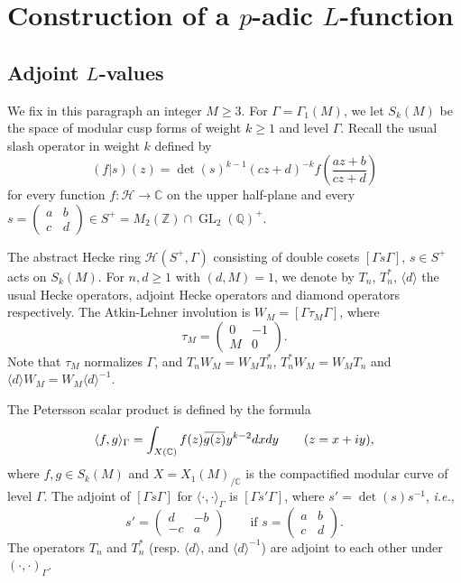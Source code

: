 \documentclass[12pt]{amsart}
\newcommand\bC{\mathbb{C}}
\newcommand\bZ{\mathbb{Z}}
\newcommand\bQ{\mathbb{Q}}
\newcommand\cH{\mathcal{H}}
\newcommand\sH{\mathscr{H}}
\newcommand{\ob}[1]{\mkern 1.5mu\overline{\mkern-1.5mu#1\mkern-1.5mu}\mkern 1.5mu}
\DeclareMathOperator{\GL}{GL}
\theoremstyle{defstyle}
\theoremstyle{thmstyle}
\begin{document}
\section{Construction of a $p$-adic $L$-function}\label{sec:section_2_construction_p_adic_L}
\subsection{Adjoint $L$-values}\label{sec:adjoint_L_values}
We fix in this paragraph an integer $M\geq 3$. For $\Gamma=\Gamma_1(M)$, we let $S_k(M)$ be the space of modular cusp forms of weight $k\geq 1$ and level $\Gamma$. Recall the usual slash operator in weight $k$ defined by
\[(f|s)(z)= \det(s)^{k-1}(cz+d)^{-k}f(\frac{az+b}{cz+d}) \] 
for every function $f\colon \sH \to \bC$ on the upper half-plane and every $s=\left(\begin{smallmatrix}a & b \\ c & d\end{smallmatrix}\right)\in S^+=M_2(\bZ)\cap \GL_2(\bQ)^+$.

The abstract Hecke ring $\cH(S^+,\Gamma)$ consisting of double cosets $[\Gamma s \Gamma]$, $s\in S^+$ acts on $S_k(M)$. For $n,d\geq 1$ with $(d,M)=1$, we denote by $T_n$, $T^*_n$, $\langle d \rangle$ the usual Hecke operators, adjoint Hecke operators and diamond operators respectively. The Atkin-Lehner involution is $W_M=[\Gamma\tau_M\Gamma]$, where
\[\tau_M=\begin{pmatrix}0 & -1 \\ M & 0\end{pmatrix}.\]
Note that $\tau_M$ normalizes $\Gamma$, and $T_n W_M=W_M T^*_n$, $T^*_nW_M=W_MT_n$ and $\langle d \rangle W_M=W_M\langle d\rangle^{-1}$.

The Petersson scalar product is defined by the formula
\[\langle f,g \rangle_\Gamma = \int_{X(\bC)}f(z)\ob{g(z)}y^{k-2}dxdy \qquad (z=x+iy),\]
 where $f,g\in S_k(M)$ and $X=X_1(M)_{/\bC}$ is the compactified modular curve of level $\Gamma$. The adjoint of $[\Gamma s \Gamma]$ for $\langle \cdot,\cdot \rangle_\Gamma$ is $[\Gamma s' \Gamma]$, where $s'=\det(s)s^{-1}$, \textit{i.e.},
 \[s'=\begin{pmatrix}d & -b \\ -c & a\end{pmatrix} \qquad \mbox{if } s=\begin{pmatrix}a & b \\ c & d\end{pmatrix}.\]
  The operators $T_n$ and $T_n^*$ (resp. $\langle d\rangle$, and $\langle d\rangle^{-1}$) are adjoint to each other under $(\cdot,\cdot)_\Gamma$.
 
\end{document}

